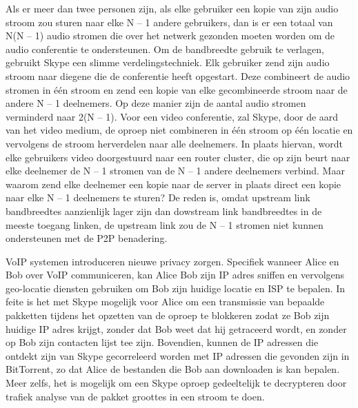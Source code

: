 Als er meer dan twee personen zijn, als elke gebruiker een kopie van zijn audio stroom zou sturen naar elke N – 1 andere gebruikers, dan is er een totaal van N(N – 1) audio stromen die over het netwerk gezonden moeten worden om de audio conferentie te ondersteunen. Om de bandbreedte gebruik te verlagen, gebruikt Skype een slimme verdelingstechniek. Elk gebruiker zend zijn audio stroom naar diegene die de conferentie heeft opgestart. Deze combineert de audio stromen in één stroom en zend een kopie van elke gecombineerde stroom naar de andere N – 1 deelnemers. Op deze manier zijn de aantal audio stromen verminderd naar 2(N – 1).
Voor een video conferentie, zal Skype, door de aard van het video medium, de oproep niet combineren in één stroom op één locatie en vervolgens de stroom herverdelen naar alle deelnemers. In plaats hiervan, wordt elke gebruikers video doorgestuurd naar een router cluster, die op zijn beurt naar elke deelnemer de N – 1 stromen van de N – 1 andere deelnemers verbind.
Maar waarom zend elke deelnemer een kopie naar de server in plaats direct een kopie naar elke N – 1 deelnemers te sturen? De reden is, omdat upstream link bandbreedtes aanzienlijk lager zijn dan dowstream link bandbreedtes in de meeste toegang linken, de upstream link zou de N – 1 stromen niet kunnen ondersteunen met de P2P benadering.

\noindent VoIP systemen introduceren nieuwe privacy zorgen. Specifiek wanneer Alice en Bob over VoIP communiceren, kan Alice Bob zijn IP adres sniffen en vervolgens geo-locatie diensten gebruiken om Bob zijn huidige locatie  en ISP te bepalen. In feite is het met Skype mogelijk voor Alice om een transmissie van bepaalde pakketten tijdens het opzetten van de oproep te blokkeren zodat ze Bob zijn huidige IP adres krijgt, zonder dat Bob weet dat hij getraceerd wordt, en zonder op Bob zijn contacten lijst tee zijn. Bovendien, kunnen de IP adressen die ontdekt zijn van Skype gecorreleerd worden met IP adressen die gevonden zijn in BitTorrent, zo dat Alice de bestanden die Bob aan downloaden is kan bepalen. Meer zelfs, het is mogelijk om een Skype oproep gedeeltelijk te decrypteren door trafiek analyse van de pakket groottes in een stroom te doen.
